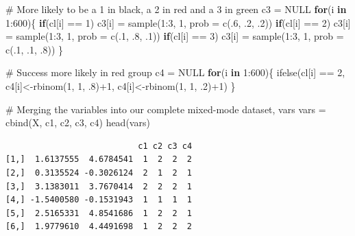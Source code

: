\documentclass[
  french,
  letterpaper,
  DIV=11,
  numbers=noendperiod]{scrartcl}
\newenvironment{Shaded}{\begin{snugshade}}{\end{snugshade}}
\newcommand{\AttributeTok}[1]{\textcolor[rgb]{0.40,0.45,0.13}{#1}}
\newcommand{\CommentTok}[1]{\textcolor[rgb]{0.37,0.37,0.37}{#1}}
\newcommand{\ConstantTok}[1]{\textcolor[rgb]{0.56,0.35,0.01}{#1}}
\newcommand{\ControlFlowTok}[1]{\textcolor[rgb]{0.00,0.23,0.31}{\textbf{#1}}}
\newcommand{\DecValTok}[1]{\textcolor[rgb]{0.68,0.00,0.00}{#1}}
\newcommand{\FunctionTok}[1]{\textcolor[rgb]{0.28,0.35,0.67}{#1}}
\newcommand{\NormalTok}[1]{\textcolor[rgb]{0.00,0.23,0.31}{#1}}
\newcommand{\OtherTok}[1]{\textcolor[rgb]{0.00,0.23,0.31}{#1}}
\newcommand{\SpecialCharTok}[1]{\textcolor[rgb]{0.37,0.37,0.37}{#1}}
\begin{document}
\begin{Shaded}
\begin{Highlighting}[]
\CommentTok{\# More likely to be a 1 in black, a 2 in red and a 3 in green}
\NormalTok{c3 }\OtherTok{=} \ConstantTok{NULL}
\ControlFlowTok{for}\NormalTok{(i }\ControlFlowTok{in} \DecValTok{1}\SpecialCharTok{:}\DecValTok{600}\NormalTok{)\{}
  \ControlFlowTok{if}\NormalTok{(cl[i] }\SpecialCharTok{==} \DecValTok{1}\NormalTok{) c3[i] }\OtherTok{=} \FunctionTok{sample}\NormalTok{(}\DecValTok{1}\SpecialCharTok{:}\DecValTok{3}\NormalTok{, }\DecValTok{1}\NormalTok{, }\AttributeTok{prob =} \FunctionTok{c}\NormalTok{(.}\DecValTok{6}\NormalTok{, .}\DecValTok{2}\NormalTok{, .}\DecValTok{2}\NormalTok{))}
  \ControlFlowTok{if}\NormalTok{(cl[i] }\SpecialCharTok{==} \DecValTok{2}\NormalTok{) c3[i] }\OtherTok{=} \FunctionTok{sample}\NormalTok{(}\DecValTok{1}\SpecialCharTok{:}\DecValTok{3}\NormalTok{, }\DecValTok{1}\NormalTok{, }\AttributeTok{prob =} \FunctionTok{c}\NormalTok{(.}\DecValTok{1}\NormalTok{, .}\DecValTok{8}\NormalTok{, .}\DecValTok{1}\NormalTok{))}
  \ControlFlowTok{if}\NormalTok{(cl[i] }\SpecialCharTok{==} \DecValTok{3}\NormalTok{) c3[i] }\OtherTok{=} \FunctionTok{sample}\NormalTok{(}\DecValTok{1}\SpecialCharTok{:}\DecValTok{3}\NormalTok{, }\DecValTok{1}\NormalTok{, }\AttributeTok{prob =} \FunctionTok{c}\NormalTok{(.}\DecValTok{1}\NormalTok{, .}\DecValTok{1}\NormalTok{, .}\DecValTok{8}\NormalTok{))}
\NormalTok{\}}


\CommentTok{\# Success more likely in red group}
\NormalTok{c4 }\OtherTok{=} \ConstantTok{NULL}
\ControlFlowTok{for}\NormalTok{(i }\ControlFlowTok{in} \DecValTok{1}\SpecialCharTok{:}\DecValTok{600}\NormalTok{)\{}
  \FunctionTok{ifelse}\NormalTok{(cl[i] }\SpecialCharTok{==} \DecValTok{2}\NormalTok{, c4[i]}\OtherTok{\textless{}{-}}\FunctionTok{rbinom}\NormalTok{(}\DecValTok{1}\NormalTok{, }\DecValTok{1}\NormalTok{, .}\DecValTok{8}\NormalTok{)}\SpecialCharTok{+}\DecValTok{1}\NormalTok{, c4[i]}\OtherTok{\textless{}{-}}\FunctionTok{rbinom}\NormalTok{(}\DecValTok{1}\NormalTok{, }\DecValTok{1}\NormalTok{, .}\DecValTok{2}\NormalTok{)}\SpecialCharTok{+}\DecValTok{1}\NormalTok{)}
\NormalTok{\}}

\CommentTok{\# Merging the variables into our complete mixed{-}mode dataset, vars}
\NormalTok{vars }\OtherTok{=} \FunctionTok{cbind}\NormalTok{(X, c1, c2, c3, c4)}
\FunctionTok{head}\NormalTok{(vars)}
\end{Highlighting}
\end{Shaded}

\begin{verbatim}
                           c1 c2 c3 c4
[1,]  1.6137555  4.6784541  1  2  2  2
[2,]  0.3135524 -0.3026124  2  1  2  1
[3,]  3.1383011  3.7670414  2  2  2  1
[4,] -1.5400580 -0.1531943  1  1  1  1
[5,]  2.5165331  4.8541686  1  2  2  1
[6,]  1.9779610  4.4491698  1  2  2  2
\end{verbatim}
\end{document}

